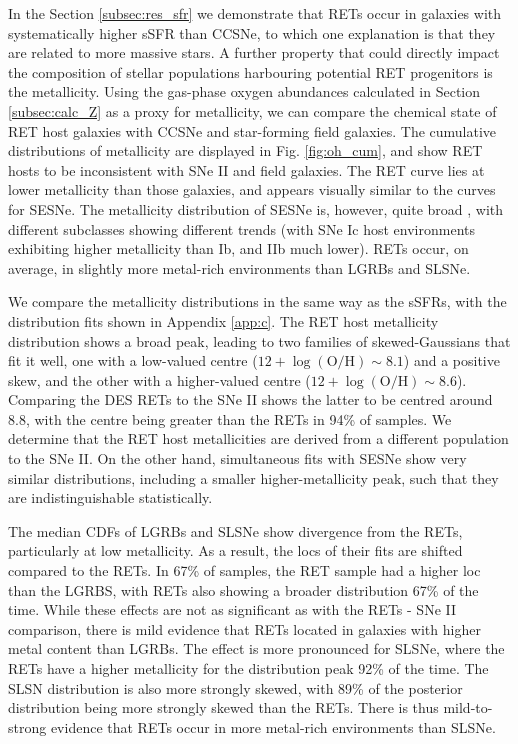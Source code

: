 \documentclass[fleqn,usenatbib,]{mnras}
\newcommand{\replychris}[1]{\color{magenta}#1 \color{black}}
\newcommand{\replylluis}[1]{\color{brown}#1 \color{black}}
\begin{document}
In the Section \ref{subsec:res_sfr} we demonstrate that RETs occur in galaxies with systematically higher sSFR than CCSNe, to which one explanation is that they are related to more massive stars. A further property that could directly impact the composition of stellar populations harbouring potential RET progenitors is the metallicity. Using the gas-phase oxygen abundances calculated in Section \ref{subsec:calc_Z} as a proxy for metallicity, we can compare the chemical state of RET host galaxies with CCSNe and star-forming field galaxies. The cumulative distributions of metallicity are displayed in Fig. \ref{fig:oh_cum}, and show RET hosts to be inconsistent with SNe II and field galaxies. The RET curve lies at lower metallicity than those galaxies, and appears visually similar to the curves for SESNe. \replylluis{The metallicity distribution of SESNe is, however, quite broad \citep[e.g.][]{Anderson2010}, with different subclasses showing different trends (with SNe Ic host environments exhibiting higher metallicity than Ib, and IIb much lower).} RETs occur, on average, in slightly more metal-rich environments than LGRBs and SLSNe.

We compare the metallicity distributions in the same way as the sSFRs, with the distribution fits shown in Appendix \ref{app:c}. The RET host metallicity distribution shows a broad peak, leading to two families of skewed-Gaussians that fit it well, one with a low-valued centre  ($12 + \log \mathrm{(O/H)} \sim 8.1$) and a positive skew, and the other with a higher-valued centre ($12 + \log \mathrm{(O/H)} \sim 8.6$). Comparing the DES RETs to the \citet{Stoll2013} SNe II shows the latter to be centred around 8.8, with the centre being greater than the RETs in 94\% of samples. We determine that the RET host metallicities are derived from a different population to the SNe II. On the other hand, simultaneous fits with SESNe show very similar distributions, including a smaller higher-metallicity peak, such that they are indistinguishable statistically. 

The median CDFs of LGRBs and SLSNe show divergence from the RETs, particularly at low metallicity. As a result, the \replychris{locs} of their fits are shifted compared to the RETs. In 67\% of samples, the RET sample had a higher \replychris{loc} than the LGRBS, with RETs also showing a broader distribution 67\% of the time. While these effects are not as significant as with the RETs - SNe II comparison, there is mild evidence that RETs located in galaxies with higher metal content than LGRBs. The effect is more pronounced for SLSNe, where the RETs have a higher metallicity for the distribution peak 92\% of the time. The SLSN distribution is also more strongly skewed, with 89\% of the posterior distribution being more strongly skewed than the RETs. There is thus mild-to-strong evidence that RETs occur in more metal-rich environments than SLSNe. 
\end{document}
